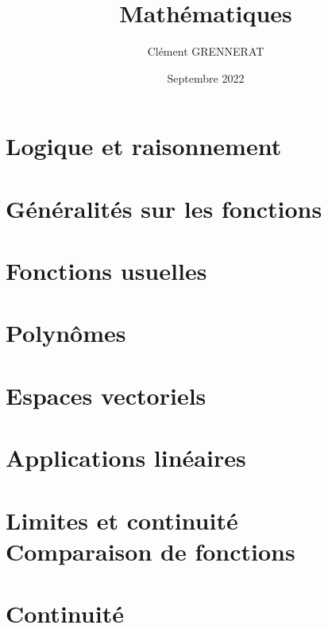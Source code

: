 \documentclass[13pt, twoside, a4paper, french]{report}
\newcommand*{\getSubject}{Mathématiques}
\begin{document}
    \title{\getSubject}
    \author{Clément GRENNERAT}
    \date{Septembre 2022}
    \pagestyle{non-chapter-style}


    \chapter{Logique et raisonnement}\label{ch:logique-et-raisonnement}
        


    \chapter{Généralités sur les fonctions}\label{ch:generalites-sur-les-fonctions}
        


    \chapter{Fonctions usuelles}\label{ch:fonctions-usuelles}
        


    \chapter{Polynômes}\label{ch:polynomes}
        


    \chapter{Espaces vectoriels}\label{ch:espaces-vectoriels}
        


    \chapter{Applications linéaires}\label{ch:applications-lineaires}
        


    \chapter{Limites et continuité\\Comparaison de fonctions}\label{ch:limites-est-continuite---comparaison-de-fonctions}
        


    \chapter{Continuité}\label{ch:continuite}
        
\end{document}

